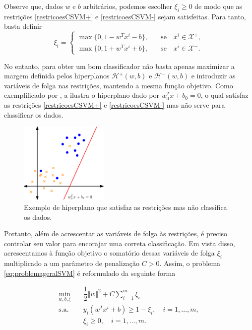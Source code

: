 \documentclass[12pt,a4paper]{scrartcl}
\def\Xset{\mathcal{X}}
\def\Hset{\mathcal{H}}
\theoremstyle{definition}%
\begin{document}
Observe que, dados $w$ e $b$ arbitrários, podemos escolher $\xi_{i} \geq 0$ de modo que as restrições \eqref{restricoesCSVM+} e \eqref{restricoesCSVM-} sejam satisfeitas. Para tanto, basta definir
\[
\xi_{i} =  \left \{ \begin{array}{cc} \max\{0, 1-w^{T}x^{i}-b\}, & \quad \text{se} \quad x^{i} \in \Xset^{+}, \\
\max\{0, 1+w^{T}x^{i}+b\}, & \quad \text{se} \quad x^{i} \in \Xset^{-}.
\end{array} \right .
\]
 
No entanto, para obter um bom classificador não basta apenas maximizar a margem definida pelos hiperplanos $\Hset^{+} (w,b)$ e $\Hset^{-} (w,b)$ e introduzir as variáveis de folga nas restrições, mantendo a mesma função objetivo. Como exemplificado por \textcite[p. 45]{Evelin2017}, a  ilustra o hiperplano dado por $w_{0}^{T}x+b_{0} = 0$, o qual satisfaz as restrições \eqref{restricoesCSVM+} e \eqref{restricoesCSVM-} mas não serve para classificar os dados. 

\begin{figure}[!ht] 
	\centering
	\includegraphics[width=0.38\textwidth]{hiperplano_nao_classifica_dados}
	\caption{Exemplo de hiperplano que satisfaz as restrições mas não classifica os dados. \label{fig:hiperplano_nao_classificador}}
\end{figure}
 
Portanto, além  de acrescentar as variáveis de folga às restrições, é preciso controlar seu valor para encorajar uma correta classificação. Em vista disso, acrescentamos à função objetivo o somatório dessas variáveis de folga $\xi_{i}$ multiplicado a um parâmetro de penalização $C>0$. Assim, o problema \eqref{eq:problemageralSVM} é reformulado da seguinte forma

\[ \label{eq:problemaCSVM}
\begin{aligned}
\min_{w,b,\xi} & \quad \dfrac{1}{2} \Vert w\Vert^{2} + C \sum_{i=1}^{m} \xi_{i} \\
\text{s.a.} &  \quad y_i(w^{T}x^{i}+b) \geq 1 - \xi_{i}, \quad i=1, \ldots , m, \\
& \quad \xi_{i} \geq 0, \quad i=1, \ldots , m.\end{aligned}
\]
\end{document}
